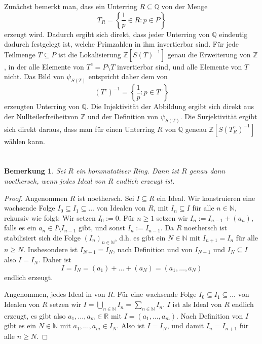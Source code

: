\documentclass[a4paper,10pt]{article}
\newcounter{satze}
\newtheorem{bem}[satze]{Bemerkung}
\theoremstyle{definition}
\newcommand{\N}{\mathbb{N}}
\newcommand{\Z}{\mathbb{Z}}
\newcommand{\Q}{\mathbb{Q}}
\newcommand{\R}{\mathbb{R}}
\begin{document}
Zunächst bemerkt man, dass ein Unterring $R \subseteq \Q$ von der Menge
\[
 T_R = \left\{ \frac{1}{p} \in R : p \in P \right\}
\]
erzeugt wird. Dadurch ergibt sich direkt, dass jeder Unterring von $\Q$ eindeutig dadurch festgelegt ist, welche Primzahlen in ihm invertierbar sind. Für jede Teilmenge $T \subseteq P$ ist die Lokalisierung $\Z[S(T)^{-1}]$ genau die Erweiterung von $\Z$, in der alle Elemente von $T^c = P \setminus T$ invertierbar sind, und alle Elemente von $T$ nicht. Das Bild von $\psi_{S(T)}$ entspricht daher dem von
\[
 (T^c)^{-1} = \left\{ \frac{1}{p} : p \in T^c \right\}
\]
erzeugten Unterring von $\Q$. Die Injektivität der Abbildung ergibt sich direkt aus der Nullteilerfreiheitvon $\Z$ und der Definition von $\psi_{S(T)}$. Die Surjektivität ergibt sich direkt daraus, dass man für einen Unterring $R$ von $\Q$ geneau $\Z[S(T_R^c)^{-1}]$ wählen kann.







\section{}


\begin{bem}\label{bem: def noethersch}
 Sei $R$ ein kommutativer Ring. Dann ist $R$ genau dann noethersch, wenn jedes Ideal von $R$ endlich erzeugt ist. 
\end{bem}
\begin{proof}
 Angenommen $R$ ist noethersch. Sei $I \subseteq R$ ein Ideal. Wir konstruieren eine wachsende Folge $I_0 \subseteq I_1 \subseteq \ldots$ von Idealen von $R$, mit $I_n \subseteq I$ für alle $n \in \N$, rekursiv wie folgt: Wir setzen $I_0 := 0$. Für $n \geq 1$ setzen wir $I_n := I_{n-1} + (a_n)$, falls es ein $a_n \in I \setminus I_{n-1}$ gibt, und sonst $I_n := I_{n-1}$. Da $R$ noethersch ist stabilisiert sich die Folge $(I_n)_{n \in \N}$, d.h. es gibt ein $N \in \N$ mit $I_{n+1} = I_n$ für alle $n \geq N$. Insbesondere ist $I_{N+1} = I_N$, nach Definition und von $I_{N+1}$ und $I_N \subseteq I$ also $I = I_N$. Daher ist
 \[
  I = I_N = (a_1) + \ldots + (a_N) = (a_1, \ldots, a_N)
 \]
 endlich erzeugt.
 
 Angenommen, jedes Ideal in von $R$. Für eine wachsende Folge $I_0 \subseteq I_1 \subseteq \ldots$ von Idealen von $R$ setzen wir $I = \bigcup_{n \in \N} I_n = \sum_{n \in \N} I_n$. $I$ ist als Ideal von $R$ endlich erzeugt, es gibt also $a_1, \ldots, a_m \in \R$ mit $I = (a_1, \ldots, a_m)$. Nach Definition von $I$ gibt es ein $N \in \N$ mit $a_1, \ldots, a_m \in I_N$. Also ist $I = I_N$, und damit $I_{n} = I_{n+1}$ für alle $n \geq N$.
\end{proof}
\end{document}
